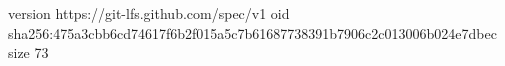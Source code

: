 version https://git-lfs.github.com/spec/v1
oid sha256:475a3cbb6cd74617f6b2f015a5c7b61687738391b7906c2c013006b024e7dbec
size 73
